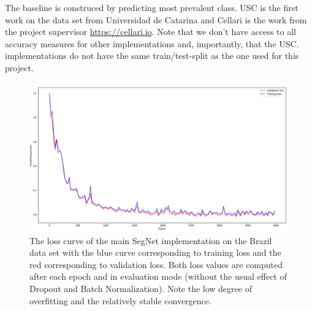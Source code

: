 \documentclass{article}
\begin{document}
The baseline is construced by predicting most prevalent class.
USC is the first work on the data set from Universidad de Catarina \cite{brazil} and Cellari is the work from the project supervisor \url{https://cellari.io}.
Note that we don't have access to all accuracy measures for other implementations and, importantly, that the USC. implementations do not have the same train/test-split as the one used for this project.
\begin{figure}[!htb]
	\centering
	\includegraphics[width=0.9\linewidth]{../../poster/loss}
	\caption{The loss curve of the main SegNet implementation on the Brazil data set with the blue curve corresponding to training loss and the red corresponding to validation loss. Both loss values are computed after each epoch and in {evaluation mode} (without the usual effect of Dropout and Batch Normalization). Note the low degree of overfitting and the relatively stable convergence. }
	\label{fig:loss}
\end{figure}




%

%
\end{document}
